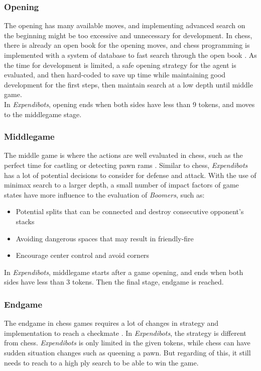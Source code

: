 \documentclass[]{article}
\newcommand{\gameName}{Expendibots}
\begin{document}
\subsubsection{Opening}

The opening has many available moves, and implementing advanced search on the beginning might be too excessive and unnecessary for development. In chess, there is already an open book for the opening moves, and chess programming is implemented with a system of database to fast search through the open book \cite{open, book}. As the time for development is limited, a safe opening strategy for the agent is evaluated, and then hard-coded to save up time while maintaining good development for the first steps, then maintain search at a low depth until middle game.\\

In \emph{\gameName}, opening ends when both sides have less than 9 tokens, and moves to the middlegame stage.

\subsubsection{Middlegame}

The middle game is where the actions are well evaluated in chess, such as the perfect time for castling or detecting pawn rams \cite{mid}. Similar to chess, \emph{\gameName} has a lot of potential decisions to consider for defense and attack. With the use of minimax search to a larger depth, a small number of impact factors of game states have more influence to the evaluation of \emph{Boomers}, such as:
\begin{itemize}
    \item Potential splits that can be connected and destroy consecutive opponent's stacks
    \item Avoiding dangerous spaces that may result in friendly-fire
    \item Encourage center control and avoid corners
\end{itemize}

In \emph{\gameName}, middlegame starts after a game opening, and ends when both sides have less than 3 tokens. Then the final stage, endgame is reached.

\subsubsection{Endgame}

The endgame in chess games requires a lot of changes in strategy and implementation to reach a checkmate \cite{end}. In \emph{\gameName}, the strategy is different from chess. \emph{\gameName} is only limited in the given tokens, while chess can have sudden situation changes such as queening a pawn. But regarding of this, it still needs to reach to a high ply search to be able to win the game. \\
\end{document}
